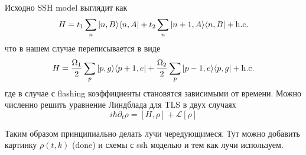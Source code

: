 Исходно SSH model выглядит как
\begin{equation*}
	H = t_1 \sum_n | n,B \rangle \langle n,A | + t_2 \sum_n | n+1, A \rangle \langle n, B | + \mathrm{h.c.}
\end{equation*}
что в нашем случае переписывается в виде
\begin{equation*}
	H = \frac{\Omega_1}{2} \sum_p | p,g \rangle \langle p+1,e | + \frac{\Omega_2}{2} \sum_p | p-1,e \rangle \langle p,g | + \mathrm{h.c.}
\end{equation*}
где в случае с flashing коэффициенты становятся зависимыми от времени. Можно численно решить уравнение Линдблада для TLS в двух случаях
\begin{equation*}
	i \hbar \partial_t \rho = [H, \rho] + \mathcal{L}[\rho]
\end{equation*}


Таким образом принципиально делать лучи чередующимеся. Тут можно добавить картинку $\rho(t, k)$ (done) и схемы с ssh моделью и тем как лучи используем. 












